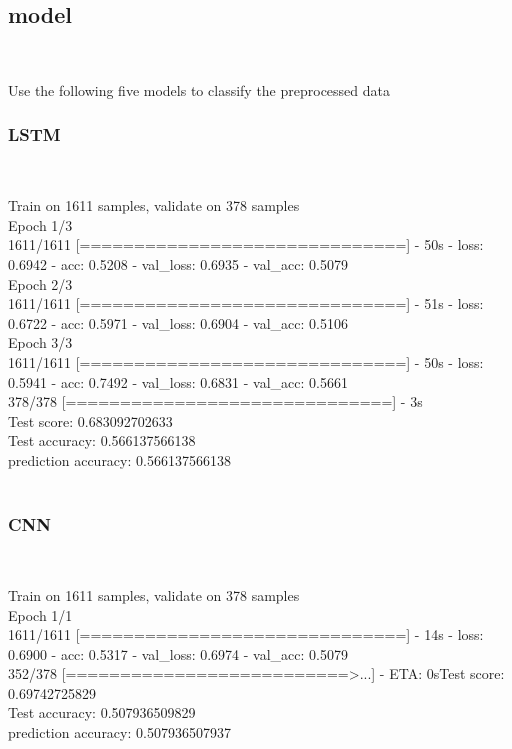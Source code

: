 \subsection{ model}
\

Use the following five models to classify the preprocessed data

\subsubsection{LSTM}
\

Train on 1611 samples, validate on 378 samples\\
Epoch 1/3\\
1611/1611 [==============================] - 50s - loss: 0.6942 - acc: 0.5208 - val_loss: 0.6935 - val_acc: 0.5079\\
Epoch 2/3\\
1611/1611 [==============================] - 51s - loss: 0.6722 - acc: 0.5971 - val_loss: 0.6904 - val_acc: 0.5106\\
Epoch 3/3\\
1611/1611 [==============================] - 50s - loss: 0.5941 - acc: 0.7492 - val_loss: 0.6831 - val_acc: 0.5661\\
378/378 [==============================] - 3s \\    
Test score: 0.683092702633\\
Test accuracy: 0.566137566138\\
prediction accuracy:  0.566137566138\\
 \

 
 \subsubsection{CNN}
 \

 Train on 1611 samples, validate on 378 samples\\
Epoch 1/1\\
1611/1611 [==============================] - 14s - loss: 0.6900 - acc: 0.5317 - val_loss: 0.6974 - val_acc: 0.5079\\
352/378 [==========================>...] - ETA: 0sTest score: 0.69742725829\\
Test accuracy: 0.507936509829\\
prediction accuracy:  0.507936507937\\
\
 

